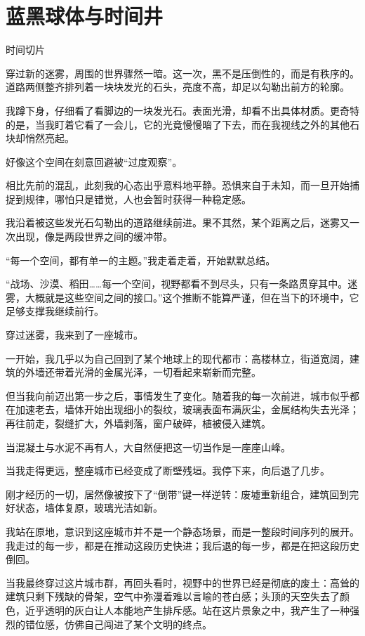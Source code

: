 \chapter{蓝黑球体与时间井}

时间切片

穿过新的迷雾，周围的世界骤然一暗。这一次，黑不是压倒性的，而是有秩序的。道路两侧整齐排列着一块块发光的石头，亮度不高，却足以勾勒出前方的轮廓。

我蹲下身，仔细看了看脚边的一块发光石。表面光滑，却看不出具体材质。更奇特的是，当我盯着它看了一会儿，它的光竟慢慢暗了下去，而在我视线之外的其他石块却悄然亮起。

好像这个空间在刻意回避被“过度观察”。

相比先前的混乱，此刻我的心态出乎意料地平静。恐惧来自于未知，而一旦开始捕捉到规律，哪怕只是错觉，人也会暂时获得一种稳定感。

我沿着被这些发光石勾勒出的道路继续前进。果不其然，某个距离之后，迷雾又一次出现，像是两段世界之间的缓冲带。

“每一个空间，都有单一的主题。”我走着走着，开始默默总结。

“战场、沙漠、稻田……每一个空间，视野都看不到尽头，只有一条路贯穿其中。迷雾，大概就是这些空间之间的接口。”这个推断不能算严谨，但在当下的环境中，它足够支撑我继续前行。

穿过迷雾，我来到了一座城市。

一开始，我几乎以为自己回到了某个地球上的现代都市：高楼林立，街道宽阔，建筑的外墙还带着光滑的金属光泽，一切看起来崭新而完整。

但当我向前迈出第一步之后，事情发生了变化。随着我的每一次前进，城市似乎都在加速老去，墙体开始出现细小的裂纹，玻璃表面布满灰尘，金属结构失去光泽；再往前走，裂缝扩大，外墙剥落，窗户破碎，植被侵入建筑。

当混凝土与水泥不再有人，大自然便把这一切当作是一座座山峰。

当我走得更远，整座城市已经变成了断壁残垣。我停下来，向后退了几步。

刚才经历的一切，居然像被按下了“倒带”键一样逆转：废墟重新组合，建筑回到完好状态，墙体复原，玻璃光洁如新。

我站在原地，意识到这座城市并不是一个静态场景，而是一整段时间序列的展开。我走过的每一步，都是在推动这段历史快进；我后退的每一步，都是在把这段历史倒回。

当我最终穿过这片城市群，再回头看时，视野中的世界已经是彻底的废土：高耸的建筑只剩下残缺的骨架，空气中弥漫着难以言喻的苍白感；头顶的天空失去了颜色，近乎透明的灰白让人本能地产生排斥感。站在这片景象之中，我产生了一种强烈的错位感，仿佛自己闯进了某个文明的终点。

